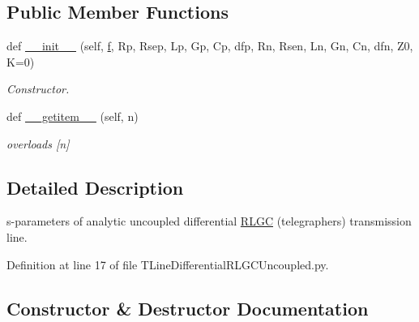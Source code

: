 \subsection*{Public Member Functions}
\begin{DoxyCompactItemize}
\item 
def \hyperlink{classSignalIntegrity_1_1SParameters_1_1Devices_1_1TLineDifferentialRLGCUncoupled_1_1TLineDifferentialRLGCUncoupled_aa6650052dc2b466ac52639326346b20a}{\+\_\+\+\_\+init\+\_\+\+\_\+} (self, \hyperlink{classSignalIntegrity_1_1SParameters_1_1SParameters_1_1SParameters_a32e7a34d6837fe949b413c852a0447f8}{f}, Rp, Rsep, Lp, Gp, Cp, dfp, Rn, Rsen, Ln, Gn, Cn, dfn, Z0, K=0)
\begin{DoxyCompactList}\small\item\em Constructor. \end{DoxyCompactList}\item 
def \hyperlink{classSignalIntegrity_1_1SParameters_1_1Devices_1_1TLineDifferentialRLGCUncoupled_1_1TLineDifferentialRLGCUncoupled_ab7a6da5139e0878b590d68292aaa70f2}{\+\_\+\+\_\+getitem\+\_\+\+\_\+} (self, n)
\begin{DoxyCompactList}\small\item\em overloads \mbox{[}n\mbox{]} \end{DoxyCompactList}\end{DoxyCompactItemize}


\subsection{Detailed Description}
s-\/parameters of analytic uncoupled differential \hyperlink{namespaceSignalIntegrity_1_1SParameters_1_1RLGC}{R\+L\+GC} (telegrapher\textquotesingle{}s) transmission line. 



Definition at line 17 of file T\+Line\+Differential\+R\+L\+G\+C\+Uncoupled.\+py.



\subsection{Constructor \& Destructor Documentation}
\mbox{\label{classSignalIntegrity_1_1SParameters_1_1Devices_1_1TLineDifferentialRLGCUncoupled_1_1TLineDifferentialRLGCUncoupled_aa6650052dc2b466ac52639326346b20a}} 
